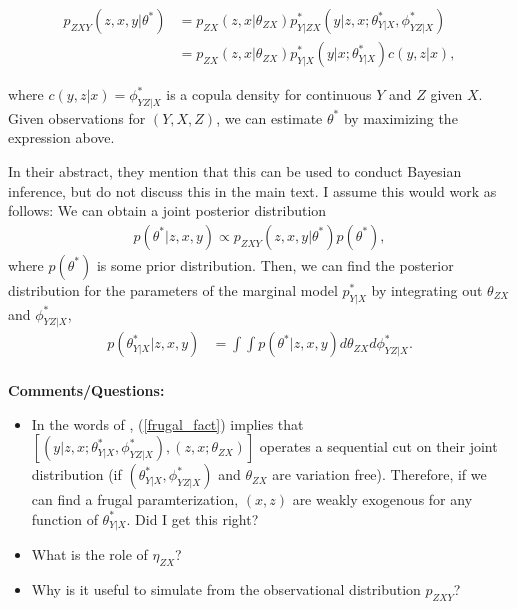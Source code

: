 \documentclass[10pt]{article}
\begin{document}
\begin{align} \label{frugal_fact}
	p_{ZXY}(z, x, y | \theta^*) &= p_{ZX}(z, x | \theta_{ZX}) p_{Y|ZX}^*(y|z, x; \theta_{Y|X}^*, \phi_{YZ | X}^*) \\
	&= p_{ZX}(z, x | \theta_{ZX}) p_{Y|X}^*(y | x; \theta_{Y|X}^*) c(y, z| x),
\end{align}

where $c(y, z | x) = \phi_{YZ | X}^* $ is a copula density for continuous $Y$ and $Z$ given $X$. Given observations for $(Y, X, Z)$, we can estimate $\theta^*$ by maximizing the expression above.

In their abstract, they mention that this can be used to conduct Bayesian inference, but do not discuss this in the main text. I assume this would work as follows: We can obtain a joint posterior distribution
\begin{align*}
	p(\theta^* | z, x, y) \propto p_{ZXY}(z, x, y | \theta^*) p(\theta^*),
\end{align*}
where $p(\theta^*)$ is some prior distribution. Then, we can find the posterior distribution for the parameters of the marginal model $p_{Y|X}^*$ by integrating out $\theta_{ZX}$ and $\phi_{YZ | X}^*$,
\begin{align*}
	p(\theta_{Y|X}^* | z, x, y) &= \int \int p(\theta^* | z, x, y) d\theta_{ZX} d\phi_{YZ | X}^*.
\end{align*} \\


\textbf{Comments/Questions:}
\begin{itemize}
	\item In the words of \cite{engle1983}, (\ref{frugal_fact}) implies that $[(y|z, x; \theta_{Y|X}^*, \phi_{YZ | X}^*), (z, x ;  \theta_{ZX})]$ operates a sequential cut on their joint distribution (if $(\theta_{Y|X}^*, \phi_{YZ | X}^*)$ and $\theta_{ZX}$ are variation free). Therefore, if we can find a frugal paramterization, $(x, z)$ are weakly exogenous for any function of $\theta_{Y|X}^*$. Did I get this right?
	\item What is the role of $\eta_{ZX}$?
	\item Why is it useful to simulate from the observational distribution $p_{ZXY}$?
\end{itemize}






\end{document}
